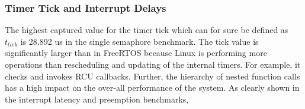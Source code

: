\subsubsection{Timer Tick and Interrupt Delays}
The highest captured value for the timer tick which can for sure be defined as $t_{tick}$ is 28.892 us in the single semaphore benchmark.
The tick value is significantly larger than in FreeRTOS because Linux is performing more operations than rescheduling and updating of the internal timers. 
For example, it checks and invokes \ac{RCU} callbacks.
Further, the hierarchy of nested function calls has a high impact on the over-all performance of the system. 
As clearly shown in the interrupt latency and preemption benchmarks, 






